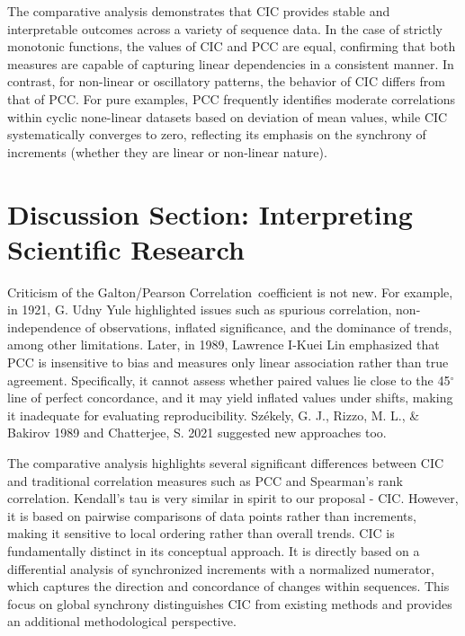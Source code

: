\documentclass[qe,nameyear,draft]{econsocart}
\newcommand{\cic}{\text{CIC}}
\newcommand{\pcc}{\text{PCC}}
\newcommand{\pccFull}{\textnormal{Galton/Pearson Correlation}}
\begin{document}
The comparative analysis demonstrates that $\cic$ provides stable and interpretable outcomes across a variety of sequence data. In the case of strictly monotonic functions, the values of $\cic$ and $\pcc$ are equal, confirming that both measures are capable of capturing linear dependencies in a consistent manner.
In contrast, for non-linear or oscillatory patterns, the behavior of $\cic$ differs from that of $\pcc$. For pure examples, $\pcc$ frequently identifies moderate correlations within cyclic none-linear datasets based on deviation of mean values, while $\cic$ systematically converges to zero, reflecting its emphasis on the synchrony of increments (whether they are linear or non-linear nature).

\section{Discussion Section: Interpreting Scientific Research}

Criticism of the \pccFull\ coefficient is not new. For example, in 1921, G. Udny Yule \cite{r1} highlighted issues such as spurious correlation, non-independence of observations, inflated significance, and the dominance of trends, among other limitations. Later, in 1989, Lawrence I-Kuei Lin \cite{r2} emphasized that $\pcc$ is insensitive to bias and measures only linear association rather than true agreement. Specifically, it cannot assess whether paired values lie close to the 45$^\circ$ line of perfect concordance, and it may yield inflated values under shifts, making it inadequate for evaluating reproducibility. Sz\'ekely, G. J., Rizzo, M. L., \& Bakirov 1989 \cite{r4} and Chatterjee, S. 2021 \cite{r5} suggested new approaches too. 

The comparative analysis highlights several significant differences between $\cic$ and traditional correlation measures such as $\pcc$ and Spearman’s rank correlation. Kendall's tau is very similar in spirit to our proposal - CIC. However, it is based on pairwise comparisons of data points rather than increments, making it sensitive to local ordering rather than overall trends.  $\cic$ is fundamentally distinct in its conceptual approach. It is directly based on a differential analysis of synchronized increments with a normalized numerator, which captures the direction and concordance of changes within sequences. This focus on global synchrony distinguishes $\cic$ from existing methods and provides an additional methodological perspective.
\end{document}
